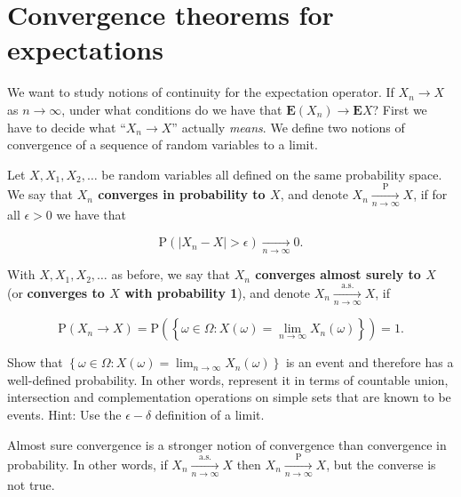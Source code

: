\section{Convergence theorems for expectations}

We want to study notions of continuity for the
expectation operator. If $X_n\to X$ as $n\to\infty$,
under what conditions do we have that
$\mathbf{E}(X_n)\to \mathbf{E} X$? First we have to
decide what ``$X_n\to X$'' actually \emph{means}. We
define two notions of convergence of a sequence of
random variables to a limit.

\begin{defn}
Let $X, X_1, X_2, \ldots$ be random variables all
defined on the same probability space. We say that
\textbf{$X_n$ converges in probability to $X$}, and denote
$X_n \xrightarrow[n\to\infty]{\mathrm{P}} X$, if for
all $\epsilon>0$ we have that

\[
\mathrm{P}(|X_n-X|>\epsilon) \xrightarrow[n\to\infty]{} 0.
\]

\end{defn}

\begin{defn}
With $X,X_1,X_2,\ldots$ as before, we say that \textbf{$X_n$
converges almost surely to $X$} (or \textbf{converges to $X$
with probability 1}), and denote
$X_n \xrightarrow[n\to\infty]{\textrm{a.s.}} X$, if

\[
\mathrm{P}( X_n \to X ) = \mathrm{P}\left(\left\{ \omega \in \Omega : X(\omega)=\lim_{n\to\infty} X_n(\omega) \right\} \right) = 1.
\]

\end{defn}

\begin{xexercise}
Show that
$\left\{ \omega \in \Omega :
X(\omega)=\lim_{n\to\infty} X_n(\omega) \right\}$
is an event and therefore has a well-defined
probability. In other words, represent it in terms of
countable union, intersection and complementation
operations on simple sets that are known to be events.
Hint: Use the $\epsilon-\delta$ definition of a
limit.
\end{xexercise}

\begin{lem}
\label{lem-convergence-types}
Almost sure convergence is a stronger notion of
convergence than convergence in probability. In other
words, if
$X_n\xrightarrow[n\to\infty]{\textrm{a.s.}} X$ then
$X_n\xrightarrow[n\to\infty]{\mathrm{P}} X$, but the
converse is not true.
\end{lem}

